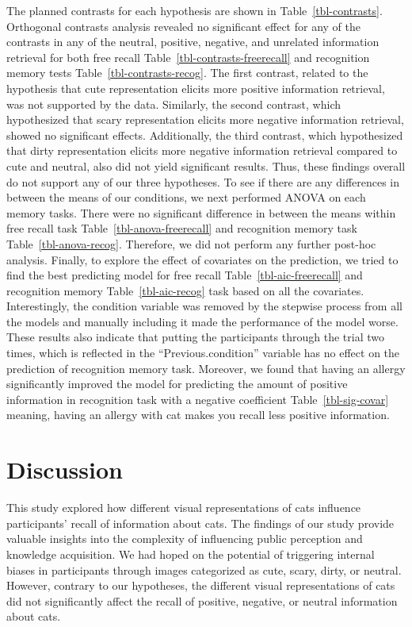 \documentclass[
  man,
  longtable,
  nolmodern,
  notxfonts,
  notimes,
  colorlinks=true,linkcolor=blue,citecolor=blue,urlcolor=blue]{apa7}
\begin{document}
The planned contrasts for each hypothesis are shown in
Table~\ref{tbl-contrasts}. Orthogonal contrasts analysis revealed no
significant effect for any of the contrasts in any of the neutral,
positive, negative, and unrelated information retrieval for both free
recall Table~\ref{tbl-contrasts-freerecall} and recognition memory tests
Table~\ref{tbl-contrasts-recog}. The first contrast, related to the
hypothesis that cute representation elicits more positive information
retrieval, was not supported by the data. Similarly, the second
contrast, which hypothesized that scary representation elicits more
negative information retrieval, showed no significant effects.
Additionally, the third contrast, which hypothesized that dirty
representation elicits more negative information retrieval compared to
cute and neutral, also did not yield significant results. Thus, these
findings overall do not support any of our three hypotheses. To see if
there are any differences in between the means of our conditions, we
next performed ANOVA on each memory tasks. There were no significant
difference in between the means within free recall task
Table~\ref{tbl-anova-freerecall} and recognition memory task
Table~\ref{tbl-anova-recog}. Therefore, we did not perform any further
post-hoc analysis. Finally, to explore the effect of covariates on the
prediction, we tried to find the best predicting model for free recall
Table~\ref{tbl-aic-freerecall} and recognition memory
Table~\ref{tbl-aic-recog} task based on all the covariates.
Interestingly, the condition variable was removed by the stepwise
process from all the models and manually including it made the
performance of the model worse. These results also indicate that putting
the participants through the trial two times, which is reflected in the
``Previous.condition'' variable has no effect on the prediction of
recognition memory task. Moreover, we found that having an allergy
significantly improved the model for predicting the amount of positive
information in recognition task with a negative coefficient
Table~\ref{tbl-sig-covar} meaning, having an allergy with cat makes you
recall less positive information.

\section{Discussion}\label{discussion}

This study explored how different visual representations of cats
influence participants' recall of information about cats. The findings
of our study provide valuable insights into the complexity of
influencing public perception and knowledge acquisition. We had hoped on
the potential of triggering internal biases in participants through
images categorized as cute, scary, dirty, or neutral. However, contrary
to our hypotheses, the different visual representations of cats did not
significantly affect the recall of positive, negative, or neutral
information about cats.
\end{document}
